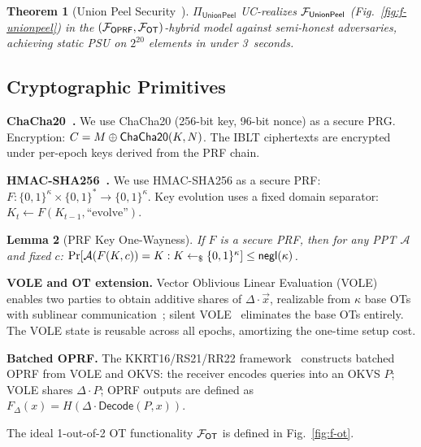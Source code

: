 \documentclass[letterpaper,twocolumn,10pt]{article}
\newtheorem{theorem}{Theorem}
\newtheorem{lemma}[theorem]{Lemma}
\theoremstyle{definition}
\newcommand{\cA}{\mathcal{A}}\newcommand{\cB}{\mathcal{B}}\newcommand{\cZ}{\mathcal{Z}}
\newcommand{\sample}{\leftarrow_{\$}}\newcommand{\concat}{\|}
\begin{document}
\begin{theorem}[Union Peel Security~\cite{PT26}]\label{thm:unionpeel-sec}
$\Pi_{\mathsf{UnionPeel}}$ UC-realizes $\mathcal{F}_{\mathsf{UnionPeel}}$
(Fig.~\ref{fig:f-unionpeel}) in the $(\mathcal{F}_{\mathsf{OPRF}},
\mathcal{F}_{\mathsf{OT}})$-hybrid model against semi-honest adversaries, achieving
static PSU on $2^{20}$ elements in under 3~seconds.
\end{theorem}

\subsection{Cryptographic Primitives}

\textbf{ChaCha20~\cite{Ber08}.} We use ChaCha20 (256-bit key, 96-bit nonce) as
a secure PRG. Encryption: $C = M \oplus \mathsf{ChaCha20}(K, N)$. The IBLT ciphertexts
are encrypted under per-epoch keys derived from the PRF chain.

\textbf{HMAC-SHA256~\cite{BCK96}.} We use HMAC-SHA256 as a secure PRF:
$F: \{0,1\}^\kappa \times \{0,1\}^* \to \{0,1\}^\kappa$. Key evolution uses a
fixed domain separator: $K_t \leftarrow F(K_{t-1}, \text{``evolve''})$.

\begin{lemma}[PRF Key One-Wayness]\label{lem:prf-ow}
If $F$ is a secure PRF, then for any PPT $\cA$ and fixed $c$:
$\Pr[\cA(F(K, c)) = K : K \sample \{0,1\}^\kappa] \leq \negl(\kappa)$.
\end{lemma}

\textbf{VOLE and OT extension.} Vector Oblivious Linear Evaluation (VOLE)
enables two parties to obtain additive shares of $\Delta \cdot \vec{x}$,
realizable from $\kappa$ base OTs with sublinear communication~\cite{RS21,RR22};
silent VOLE~\cite{RRT23} eliminates the base OTs entirely. The VOLE state is
reusable across all epochs, amortizing the one-time setup cost.

\textbf{Batched OPRF.} The KKRT16/RS21/RR22 framework~\cite{KKRT16,RS21,RR22}
constructs batched OPRF from VOLE and OKVS: the receiver encodes queries into
an OKVS $P$; VOLE shares $\Delta \cdot P$; OPRF outputs are defined as
$F_\Delta(x) = H(\Delta \cdot \mathsf{Decode}(P, x))$.

The ideal 1-out-of-2 OT functionality $\mathcal{F}_{\mathsf{OT}}$ is defined in
Fig.~\ref{fig:f-ot}.
\end{document}
